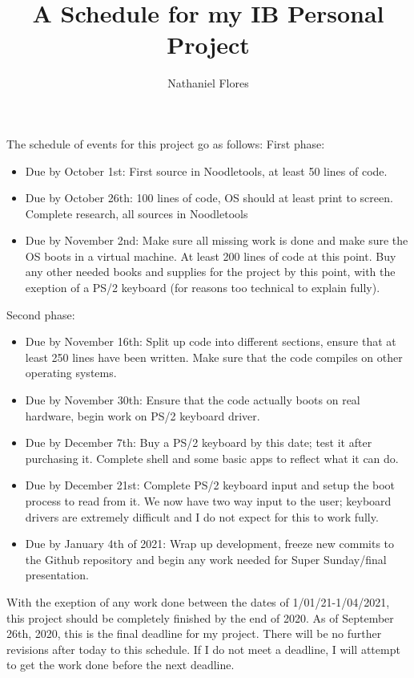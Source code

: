 \documentclass[a4paper,10pt]{article}
\title{A Schedule for my IB Personal Project}
\author{Nathaniel Flores}
\begin{document}
\maketitle
The schedule of events for this project go as follows:
\newline
\newline
First phase:
\begin{itemize}
 \item Due by October 1st: First source in Noodletools, at least 50 lines of code.
 \item Due by October 26th: 100 lines of code, OS should at least print to screen. Complete research, all sources in Noodletools
 \item Due by November 2nd: Make sure all missing work is done and make sure the OS boots in a virtual machine. At least 200 lines of code at this point. Buy any other needed books and supplies for the project by this point, with the exeption of a PS/2 keyboard (for reasons too technical to explain fully).
\end{itemize}
Second phase:
\begin{itemize}
 \item Due by November 16th: Split up code into different sections, ensure that at least 250 lines have been written. Make sure that the code compiles on other operating systems.
 \item Due by November 30th: Ensure that the code actually boots on real hardware, begin work on PS/2 keyboard driver.
 \item Due by December 7th: Buy a PS/2 keyboard by this date; test it after purchasing it. Complete shell and some basic apps to reflect what it can do.
 \item Due by December 21st: Complete PS/2 keyboard input and setup the boot process to read from it. We now have two way input to the user; keyboard drivers are extremely difficult and I do not expect for this to work fully.
 \item Due by January 4th of 2021: Wrap up development, freeze new commits to the Github repository and begin any work needed for Super Sunday/final presentation.
\end{itemize}
With the exeption of any work done between the dates of 1/01/21-1/04/2021, this project should be completely finished by the end of 2020. As of September 26th, 2020, this is the final deadline for my project. There will be no further revisions after today to this schedule. If I do not meet a deadline, I will attempt to get the work done before the next deadline.
\end{document}
